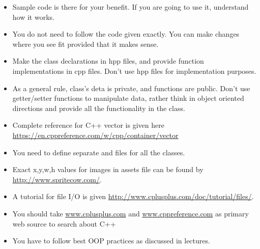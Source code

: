 \documentclass[a4paper,12pt]{article}
\begin{document}
\begin{itemize}
	\item Sample code is there for your benefit. If you are going to use it, understand how it works.
	\item You do not need to follow the code given exactly. You can make changes where you see fit provided that it makes sense.
	\item Make the class declarations in hpp files, and provide function implementations in cpp files. Don't use hpp files for implementation purposes.
	\item As a general rule, class's deta is private, and functions are public. Don't use getter/setter functions to manipulate data, rather think in object oriented directions and provide all the functionality in the class.
	\item Complete reference for C++ vector is given here \url{https://en.cppreference.com/w/cpp/container/vector}
	\item You need to define separate  and  files for all the classes.
	\item Exact x,y,w,h values for images in assets file can be found by \url{http://www.spritecow.com/}.
	\item A tutorial for file I/O is given \url{http://www.cplusplus.com/doc/tutorial/files/}.
	\item You should take \url{www.cplusplus.com} and \url{www.cppreference.com} as primary web source to search about C++
	\item You have to follow best OOP practices as discussed in lectures.
\end{itemize}

\newpage
\end{document}
